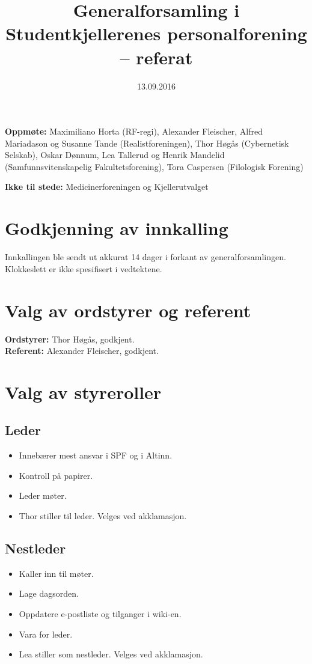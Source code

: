 \documentclass{article}[12pt]
\begin{document}
\title{Generalforsamling i Studentkjellerenes personalforening – referat}
\date{13.09.2016}
\maketitle

\textbf{Oppmøte:} 
    Maximiliano Horta (RF-regi), Alexander Fleischer, 
    Alfred Mariadason 
    og Susanne Tande (Realistforeningen), Thor Høgås 
    (Cybernetisk Selskab), 
    Oskar Dønnum, Lea Tallerud 
    og Henrik Mandelid (Samfunnsvitenskapelig Fakultetsforening), 
    Tora Caspersen (Filologisk Forening)

\textbf{Ikke til stede:} Medicinerforeningen og Kjellerutvalget


\section{Godkjenning av innkalling}
Innkallingen ble sendt ut akkurat 14 dager i forkant av
generalforsamlingen. Klokkeslett er ikke spesifisert
i vedtektene.

\section{Valg av ordstyrer og referent}
\textbf{Ordstyrer:} Thor Høgås, godkjent.\\
\textbf{Referent:} Alexander Fleischer, godkjent.

\section{Valg av styreroller}
    \subsection{Leder}
        \begin{itemize}
            \item Innebærer mest ansvar i SPF og i Altinn.
            \item Kontroll på papirer.
            \item Leder møter.
            \item Thor stiller til leder. Velges ved akklamasjon.
        \end{itemize}
        
    \subsection{Nestleder}
        \begin{itemize}
            \item Kaller inn til møter.
            \item Lage dagsorden.
            \item Oppdatere e-postliste og tilganger i wiki-en.
            \item Vara for leder.
            \item Lea stiller som nestleder. Velges ved akklamasjon.
        \end{itemize}
\end{document}
